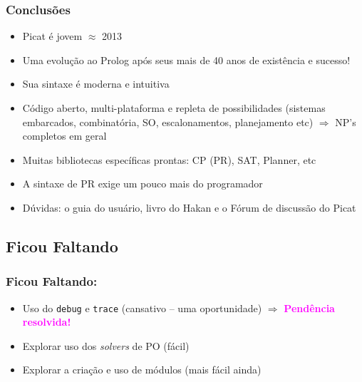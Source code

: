 \begin{frame}[fragile]

    \frametitle{Conclusões}

    \begin{itemize}
      \item Picat é jovem  $\approx$ 2013
      \pause
      \item Uma evolução ao Prolog após seus mais de 40 anos de existência e sucesso!
      \pause
      \item Sua sintaxe é moderna e intuitiva
      \pause
      \item Código aberto, multi-plataforma e repleta de possibilidades (sistemas embarcados, combinatória,
      SO, escalonamentos, planejamento etc) $\Rightarrow$ NP's completos em geral
      \pause
      \item Muitas bibliotecas específicas prontas: CP (PR), SAT, Planner, etc
      \pause
      \item A sintaxe de PR exige um pouco mais do programador
      \pause
      \item Dúvidas: o guia do usuário, livro do Hakan e o Fórum de discussão do Picat

    \end{itemize}
\end{frame}



\subsection{Ficou Faltando}
\begin{frame}[fragile]

    \frametitle{Ficou Faltando:}

    \begin{itemize}
      \item Uso do \texttt{debug} e \texttt{trace} (cansativo -- uma oportunidade) $\Rightarrow$ \textcolor{magenta}{\textbf{Pendência resolvida!}} 

     \pause
     \item Explorar uso dos \textit{solvers} de PO (fácil)

      \pause
      \item Explorar a criação e  uso de módulos  (mais fácil ainda)



    \end{itemize}
\end{frame}




